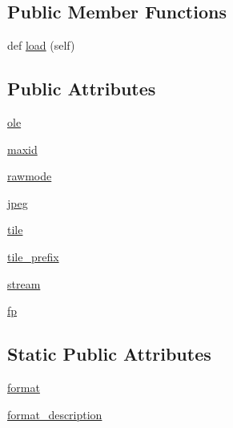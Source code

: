 \subsection*{Public Member Functions}
\begin{DoxyCompactItemize}
\item 
def \hyperlink{classPIL_1_1FpxImagePlugin_1_1FpxImageFile_a04150423969a11683544fe7af73311a9}{load} (self)
\end{DoxyCompactItemize}
\subsection*{Public Attributes}
\begin{DoxyCompactItemize}
\item 
\hyperlink{classPIL_1_1FpxImagePlugin_1_1FpxImageFile_a6759fc3be3768d8e868ca2b2850c194b}{ole}
\item 
\hyperlink{classPIL_1_1FpxImagePlugin_1_1FpxImageFile_a05641d90ec87a9f8affd1c4e45a15955}{maxid}
\item 
\hyperlink{classPIL_1_1FpxImagePlugin_1_1FpxImageFile_a51cb366bdeaf6a692275f170b44b8adb}{rawmode}
\item 
\hyperlink{classPIL_1_1FpxImagePlugin_1_1FpxImageFile_a91f19a5c7c69f1f01597d23ad5ff40f0}{jpeg}
\item 
\hyperlink{classPIL_1_1FpxImagePlugin_1_1FpxImageFile_aa5607d936696eb9dfe65ae6f8829d7db}{tile}
\item 
\hyperlink{classPIL_1_1FpxImagePlugin_1_1FpxImageFile_ac04366509d1db34e3a154de62bbfe8b3}{tile\+\_\+prefix}
\item 
\hyperlink{classPIL_1_1FpxImagePlugin_1_1FpxImageFile_a45bffd0db22835c10b283089c9ae86a2}{stream}
\item 
\hyperlink{classPIL_1_1FpxImagePlugin_1_1FpxImageFile_a379248242edb5fc51fe26aea209172ca}{fp}
\end{DoxyCompactItemize}
\subsection*{Static Public Attributes}
\begin{DoxyCompactItemize}
\item 
\hyperlink{classPIL_1_1FpxImagePlugin_1_1FpxImageFile_a82caf64d7d3e9e1b823354ef098c5e7e}{format}
\item 
\hyperlink{classPIL_1_1FpxImagePlugin_1_1FpxImageFile_add10e8e5183281ffcd70a4e89d64eb5c}{format\+\_\+description}
\end{DoxyCompactItemize}


